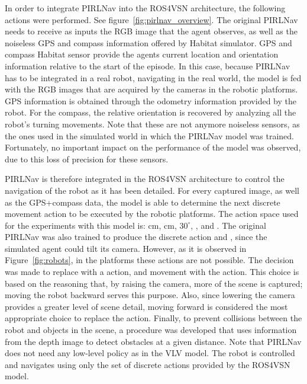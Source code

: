 In order to integrate PIRLNav into the ROS4VSN architecture, the following actions were performed.
See figure~\ref{fig:pirlnav_overview}.
The original PIRLNav needs to receive as inputs the RGB image that the agent observes, as well as the noiseless GPS and compass information offered by Habitat simulator.
GPS and compass Habitat sensor provide the agent\textquotesingle s current location and orientation information relative to the start of the episode.
In this case, because PIRLNav has to be integrated in a real robot, navigating in the real world, the model is fed with the RGB images that are acquired by the cameras in the robotic platforms.
GPS information is obtained through the odometry information provided by the robot.
For the compass, the relative orientation is recovered by analyzing all the robot's turning movements.
Note that these are not anymore noiseless sensors, as the ones used in the simulated world in which the PIRLNav model was trained.
Fortunately, no important impact on the performance of the model was observed, due to this loss of precision for these sensors.

PIRLNav is therefore integrated in the ROS4VSN architecture to control the navigation of the robot as it has been detailed.
For every captured image, as well as the GPS+compass data, the model is able to determine the next discrete movement action to be executed by the robotic platforms.
The action space used for the experiments with this model is:  cm,  cm, \turnright $30^\circ$, \turnleft, and \stopac.
The original PIRLNav was also trained to produce the discrete action \lookup and \lookdown, since the simulated agent could tilt its camera.
However, as it is observed in Figure~\ref{fig:robots}, in the platforms these actions are not possible.
The decision was made to replace \lookup with a \movebackward action, and \lookdown movement with the \moveforward action.
This choice is based on the reasoning that, by raising the camera, more of the scene is captured; moving the robot backward serves this purpose.
Also, since lowering the camera provides a greater level of scene detail, moving forward is considered the most appropriate choice to replace the \lookdown action.
Finally, to prevent collisions between the robot and objects in the scene, a procedure was developed that uses information from the depth image to detect obstacles at a given distance.
Note that PIRLNav does not need any low-level policy as in the VLV model.
The robot is controlled and navigates using only the set of discrete actions provided by the ROS4VSN model.


